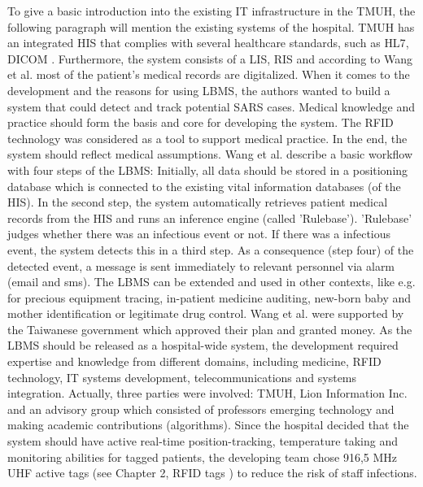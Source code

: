 To give a basic introduction into the existing IT infrastructure in the TMUH, the following paragraph will mention the existing systems of the hospital. TMUH has an integrated HIS that complies with several healthcare standards, such as \ac{HL7}, \ac{DICOM} \cite[p.3 ff.]{casestudy}. Furthermore, the system consists of a LIS, RIS and according to Wang et al. most of the patient's medical records are digitalized. When it comes to the development and the reasons for using LBMS, the authors wanted to build a system that could detect and track potential SARS cases. Medical knowledge and practice should form the basis and core for developing the system. The RFID technology was considered as a tool to support medical practice. In the end, the system should reflect medical assumptions. 
Wang et al. describe a basic workflow with four steps of the LBMS: Initially, all data should be stored in a positioning database which is connected to the existing vital information databases (of the HIS). In the second step, the system automatically retrieves patient medical records from the HIS and runs an inference engine (called 'Rulebase').  'Rulebase' judges whether there was an infectious event or not. If there was a infectious event, the system detects this in a third step. As a consequence (step four) of the detected event, a message is sent immediately to relevant personnel via alarm (email and sms). 
The LBMS can be extended and used in other contexts, like e.g. for precious equipment tracing, in-patient medicine auditing, new-born baby and mother identification or legitimate drug control.
Wang et al. were supported by the Taiwanese government which approved their plan and granted money. As the LBMS should be released as a hospital-wide system, the development required expertise and knowledge from different domains, including medicine, RFID technology, IT systems development, telecommunications and systems integration. Actually, three parties were involved: TMUH, Lion Information Inc. and an advisory group \cite[p.4]{casestudy} which consisted of professors emerging technology and making academic contributions (algorithms).
Since the hospital decided that the system should have active real-time position-tracking, temperature taking and monitoring abilities for tagged patients, the developing team chose 916,5 MHz UHF active tags (see Chapter 2, RFID tags \pageref{tag}) to reduce the risk of staff infections.

